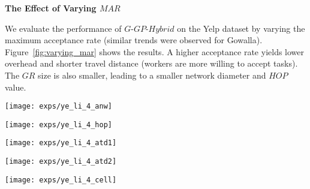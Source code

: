 \documentclass{USC-Thesis}
\numberwithin{equation}{chapter}
\begin{document}
\textbf{The Effect of Varying $\mathit{MAR}$}

We evaluate the performance of $G$-$\mathit{GP}$-$\mathit{Hybrid}$ on the Yelp dataset by varying the maximum acceptance rate
(similar trends were observed for Gowalla). Figure~\ref{fig:varying_mar} shows the results.
A higher acceptance rate yields lower overhead and shorter travel distance (workers are more willing to accept tasks). The $\mathit{GR}$ size is also smaller, leading to a smaller network diameter and $\mathit{HOP}$ value.


\begin{figure*}[tbh]
	\begin{minipage}[b]{0.195\linewidth}
	\centering
		\texttt{[image: exps/ye\_li\_4\_anw]}
		\label{fig:ye_li_4_anw}
	\end{minipage}
	\begin{minipage}[b]{0.195\linewidth}
	\centering
		\texttt{[image: exps/ye\_li\_4\_hop]}
		\label{fig:ye_li_4_hop}
	\end{minipage}
	\begin{minipage}[b]{0.195\linewidth}
	\centering
		\texttt{[image: exps/ye\_li\_4\_atd1]}
		\label{fig:ye_li_4_atd1}
	\end{minipage}	
	\begin{minipage}[b]{0.195\linewidth}
	\centering
		\texttt{[image: exps/ye\_li\_4\_atd2]}
		\label{fig:ye_li_4_atd2}
	\end{minipage}
	\begin{minipage}[b]{0.195\linewidth}
		\centering
		\texttt{[image: exps/ye\_li\_4\_cell]}
		\label{fig:ye_li_4_cell}
	\end{minipage}
	\caption{Performance of geocast algorithm ($G$-$\mathit{GP}$-$\mathit{Hybrid}$) when varying Acceptance Rate (Ye.-Linear).}
\label{fig:varying_mar}
\end{figure*}
\end{document}
